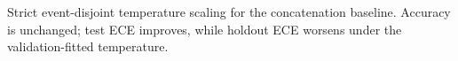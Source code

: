 \begin{table}[t]
\centering
\caption{Strict event-disjoint temperature scaling for the concatenation
baseline. Accuracy is unchanged; test ECE improves, while holdout ECE
worsens under the validation-fitted temperature.}
\label{tab:calibration}
\resizebox{\columnwidth}{!}{
}
\end{table}
